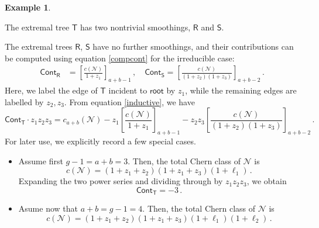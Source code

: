 \documentclass[11pt]{amsart}
\theoremstyle{definition}
\newtheorem{example}[thm]{Example}
\newcommand{\N}{\mathcal{N}}
\begin{document}
{\begin{example}
\begin{center}
\end{center}
The extremal tree $\mathsf{T}$ has two nontrivial smoothings, $\mathsf{R}$ and $\mathsf{S}$. 
\begin{center}
\end{center}
The extremal trees $\mathsf R$, $\mathsf S$ have no further smoothings, and their contributions can be computed using equation \eqref{compcont} for the irreducible case:
\begin{align*}
    \mathsf{Cont}_{\mathsf{R}}&=\left[\frac{c(\N)}{1+ z_1}\right]_{a+b-1}\, ,\quad
\mathsf{Cont}_{\mathsf{S}}=\left[\frac{c(\N)}{(1+ z_2)(1+z_3)}\right]_{a+b-2}\,.
\end{align*}
 Here, we label the edge  of $\mathsf T$ incident to  $\mathsf{root}$ by $z_1$, while the remaining edges are labelled by $z_2, z_3$.  
From equation \eqref{inductive}, we have
\[
\mathsf{Cont}_{\mathsf{T}}\cdot z_1z_2z_3=c_{a+b}(\N)-z_1\left[\frac{c(\N)}{1+ z_1}\right]_{a+b-1}-z_2z_3\left[\frac{c(\N)}{(1+ z_2)(1+z_3)}\right]_{a+b-2}\,.
\]
For later use, we explicitly record a few special cases. 
\begin{itemize}
    \item [(i)] Assume first $g-1=a+b=3$. 
Then, the total Chern class of $\N$ is
\[
c(\N)=(1+z_1+z_2)(1+z_1+z_3)(1+\ell_1)\,. %
\]
Expanding the two power series and dividing through by $z_1z_2z_3$, we obtain
$$\mathsf{Cont}_{\mathsf T}=-3\,.$$
\item [(ii)] Asume now that $a+b=g-1=4.$
Then, the total Chern class of $\N$ is
\[
c(\N)=(1+z_1+z_2)(1+z_1+z_3)(1+\ell_1)(1+\ell_2)\,. %
\]
\end{itemize}
\end{example}}
\end{document}
